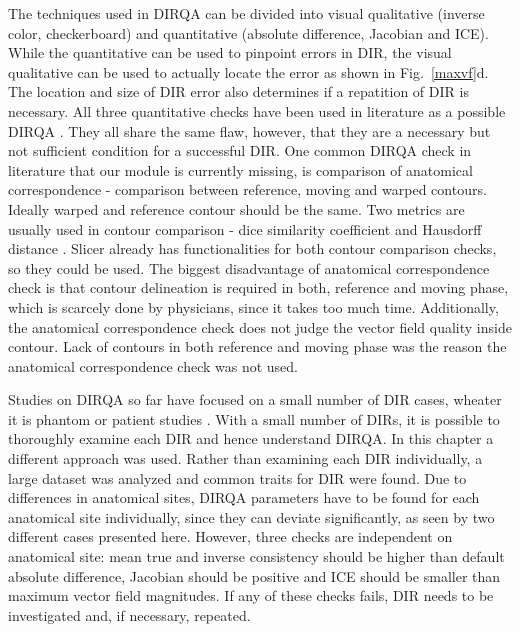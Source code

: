 \documentclass[type=dr, dr=rernat, accentcolor=tud7b,colorbacktitle, bigchapter, openright, twoside, 12pt ]{tudthesis}
\begin{document}
The techniques used in DIRQA can be divided into visual qualitative (inverse color, checkerboard) and quantitative (absolute difference, Jacobian and ICE). While the quantitative can be used to pinpoint errors in DIR, the visual qualitative
can be used to actually locate the error as shown in Fig.~\ref{maxvf}d. The location and size of DIR error also determines if a repatition of DIR is necessary.
All three quantitative checks have been used in literature as a possible DIRQA \cite{Varadhan2013, Leow2007, Christensen2001, Bender2009}.
They all share the same flaw, however, that they are a necessary but not sufficient condition for a successful DIR. 
One common DIRQA check in literature that our module is currently missing, is comparison of anatomical correspondence - 
comparison between reference, moving and warped contours. Ideally warped and reference contour should be the same. Two metrics are usually used in contour comparison -
dice similarity coefficient \cite{Varadhan2013} and Hausdorff distance \cite{Huttenlocher1993}. Slicer already has functionalities for both contour comparison checks, so they could be used. 
The biggest disadvantage of anatomical correspondence check is that contour delineation is required in both, reference and moving phase, which is scarcely done by physicians, 
since it takes too much time. Additionally, the anatomical correspondence check does not judge the vector field quality inside contour.
Lack of contours in both reference and moving phase was the reason the anatomical correspondence check was not used.

Studies on DIRQA so far have focused on a small number of DIR cases, wheater it is phantom \cite{Mutic2001,Moore2004} or patient studies \cite{Wu2008, Varadhan2013}. With a small number of DIRs,
it is possible to thoroughly examine each DIR and hence understand DIRQA. In this chapter a different approach was
used. Rather than examining each DIR individually, a large dataset was analyzed and common traits for DIR were found. Due to differences in anatomical sites, 
DIRQA parameters have to be found for each anatomical site individually, since they can
deviate significantly, as seen by two different cases presented here. However, three checks are independent on anatomical site: mean true and inverse consistency should be higher than 
default absolute difference, Jacobian should be positive and ICE should be smaller than maximum vector field magnitudes. 
If any of these checks fails, DIR needs to be investigated and, if necessary, repeated.
\end{document}

